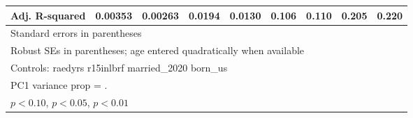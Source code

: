 \begin{table}[htbp]
\begin{tabular}{l*{8}{c}}
Adj. R-squared  &  0.00353         &  0.00263         &   0.0194         &   0.0130         &    0.106         &    0.110         &    0.205         &    0.220         \\
\bottomrule
\multicolumn{9}{l}{\footnotesize Standard errors in parentheses}\\
\multicolumn{9}{l}{\footnotesize Robust SEs in parentheses; age entered quadratically when available}\\
\multicolumn{9}{l}{\footnotesize Controls:  raedyrs r15inlbrf married\_2020 born\_us}\\
\multicolumn{9}{l}{\footnotesize PC1 variance prop =      .}\\
\multicolumn{9}{l}{\footnotesize \sym{*} \(p<0.10\), \sym{**} \(p<0.05\), \sym{***} \(p<0.01\)}\\
\end{tabular}
\end{table}
